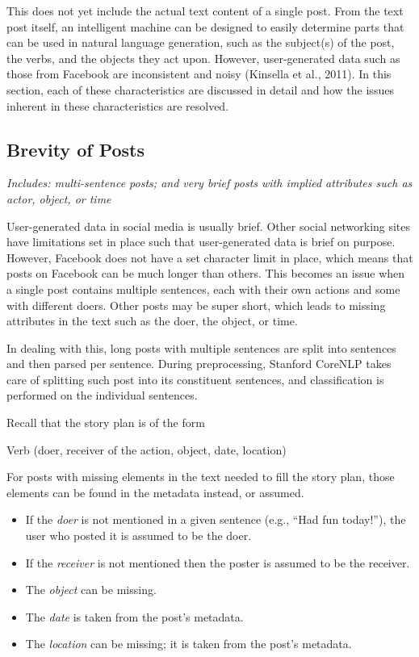 This does not yet include the actual text content of a single post. From the text post itself, an intelligent machine can be designed to easily determine parts that can be used in natural language generation, such as the subject(s) of the post, the verbs, and the objects they act upon. However, user-generated data such as those from Facebook are inconsistent and noisy (Kinsella et al., 2011). In this section, each of these characteristics are discussed in detail and how the issues inherent in these characteristics are resolved.

\subsection{Brevity of Posts}
\textit{Includes: multi-sentence posts; and very brief posts with implied attributes such as actor, object, or time}

User-generated data in social media is usually brief. Other social networking sites have limitations set in place such that user-generated data is brief on purpose. However, Facebook does not have a set character limit in place, which means that posts on Facebook can be much longer than others. This becomes an issue when a single post contains multiple sentences, each with their own actions and some with different doers. Other posts may be super short, which leads to missing attributes in the text such as the doer, the object, or time.

In dealing with this, long posts with multiple sentences are split into sentences and then parsed per sentence. During preprocessing, Stanford CoreNLP takes care of splitting such post into its constituent sentences, and classification is performed on the individual sentences.

Recall that the story plan is of the form
\begin{center} Verb (doer, receiver of the action, object, date, location) \end{center}

For posts with missing elements in the text needed to fill the story plan, those elements can be found in the metadata instead, or assumed. 
\begin{itemize}
	\item If the \textit{doer} is not mentioned in a given sentence (e.g., ``Had fun today!”), the user who posted it is assumed to be the doer.
	\item If the \textit{receiver} is not mentioned then the poster is assumed to be the receiver.
	\item The \textit{object} can be missing.
	\item The \textit{date} is taken from the post's metadata.
	\item The \textit{location} can be missing; it is taken from the post's metadata.
\end{itemize}

